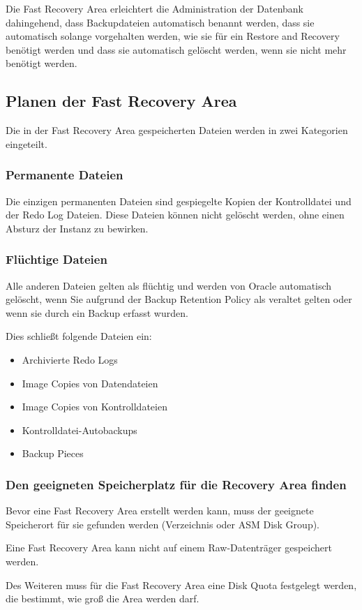       Die Fast Recovery Area erleichtert die Administration der Datenbank dahingehend, dass Backupdateien automatisch benannt werden, dass sie automatisch solange vorgehalten werden, wie sie f\"ur ein Restore and Recovery ben\"otigt werden und dass sie automatisch gel\"oscht werden, wenn sie nicht mehr ben\"otigt werden.
      \subsection{Planen der Fast Recovery Area}
        Die in der Fast Recovery Area gespeicherten Dateien werden in zwei Kategorien eingeteilt.
        \subsubsection{Permanente Dateien}
          Die einzigen permanenten Dateien sind gespiegelte Kopien der Kontrolldatei und der Redo Log Dateien. Diese Dateien k\"onnen nicht gel\"oscht werden, ohne einen Absturz der Instanz zu bewirken.
        \subsubsection{Fl\"uchtige Dateien}
          Alle anderen Dateien gelten als fl\"uchtig und werden von Oracle automatisch gel\"oscht, wenn Sie aufgrund der Backup Retention Policy als veraltet gelten oder wenn sie durch ein Backup erfasst wurden.

          Dies schlie\ss{}t folgende Dateien ein:
          \begin{itemize}
            \item Archivierte Redo Logs
            \item Image Copies von Datendateien
            \item Image Copies von Kontrolldateien
            \item Kontrolldatei-Autobackups
            \item Backup Pieces
          \end{itemize}
        \subsubsection{Den geeigneten Speicherplatz f\"ur die Recovery Area finden}
          Bevor eine Fast Recovery Area erstellt werden kann, muss der geeignete
          Speicherort f\"ur sie gefunden werden (Verzeichnis oder ASM Disk
          Group).
\clearpage
          \begin{merke}
            Eine Fast Recovery Area kann nicht auf einem Raw-Datentr\"ager gespeichert werden.
          \end{merke}
          Des Weiteren muss f\"ur die Fast Recovery Area eine Disk Quota festgelegt werden, die bestimmt, wie gro\ss{} die Area werden darf.

